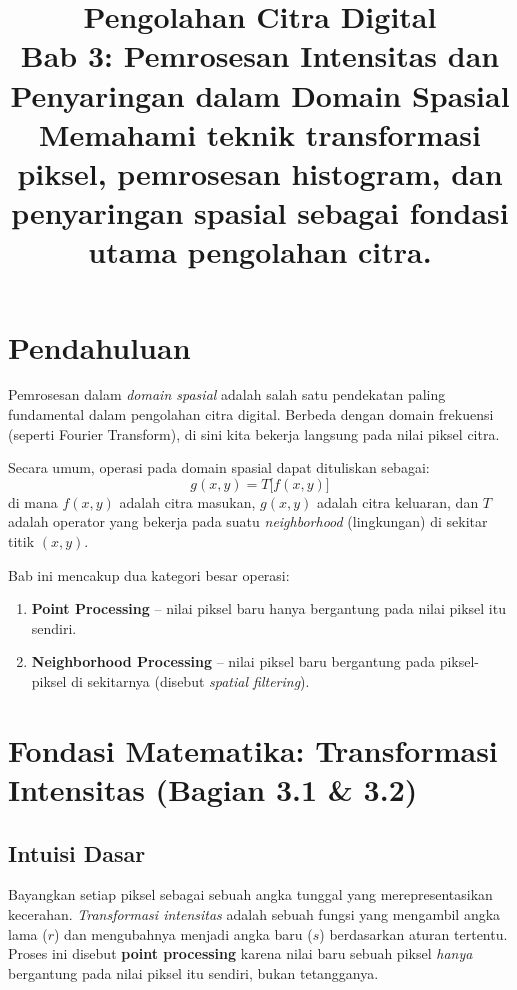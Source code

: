 \documentclass[12pt,a4paper]{article}
\title{
  {\LARGE\bfseries Pengolahan Citra Digital}\\[0.5em]
  {\large Bab 3: Pemrosesan Intensitas dan Penyaringan dalam Domain Spasial}\\[0.8em]
  {\normalsize Memahami teknik transformasi piksel, pemrosesan histogram, dan penyaringan spasial sebagai fondasi utama pengolahan citra.}
}
\author{}
\date{}
\begin{document}
\maketitle
\thispagestyle{fancy}
\tableofcontents
\newpage

\section{Pendahuluan}

Pemrosesan dalam \textit{domain spasial} adalah salah satu pendekatan paling fundamental dalam pengolahan citra digital. Berbeda dengan domain frekuensi (seperti Fourier Transform), di sini kita bekerja langsung pada nilai piksel citra.

Secara umum, operasi pada domain spasial dapat dituliskan sebagai:
\begin{equation}
  g(x,y) = T\bigl[f(x,y)\bigr]
  \label{eq:spatial_domain_general}
\end{equation}
di mana $f(x,y)$ adalah citra masukan, $g(x,y)$ adalah citra keluaran, dan $T$ adalah operator yang bekerja pada suatu \textit{neighborhood} (lingkungan) di sekitar titik $(x,y)$.

Bab ini mencakup dua kategori besar operasi:
\begin{enumerate}
  \item \textbf{Point Processing} -- nilai piksel baru hanya bergantung pada nilai piksel itu sendiri.
  \item \textbf{Neighborhood Processing} -- nilai piksel baru bergantung pada piksel-piksel di sekitarnya (disebut \textit{spatial filtering}).
\end{enumerate}

\section{Fondasi Matematika: Transformasi Intensitas (Bagian 3.1 \& 3.2)}

\subsection{Intuisi Dasar}

Bayangkan setiap piksel sebagai sebuah angka tunggal yang merepresentasikan kecerahan. \textit{Transformasi intensitas} adalah sebuah fungsi yang mengambil angka lama ($r$) dan mengubahnya menjadi angka baru ($s$) berdasarkan aturan tertentu. Proses ini disebut \textbf{point processing} karena nilai baru sebuah piksel \textit{hanya} bergantung pada nilai piksel itu sendiri, bukan tetangganya.
\end{document}
